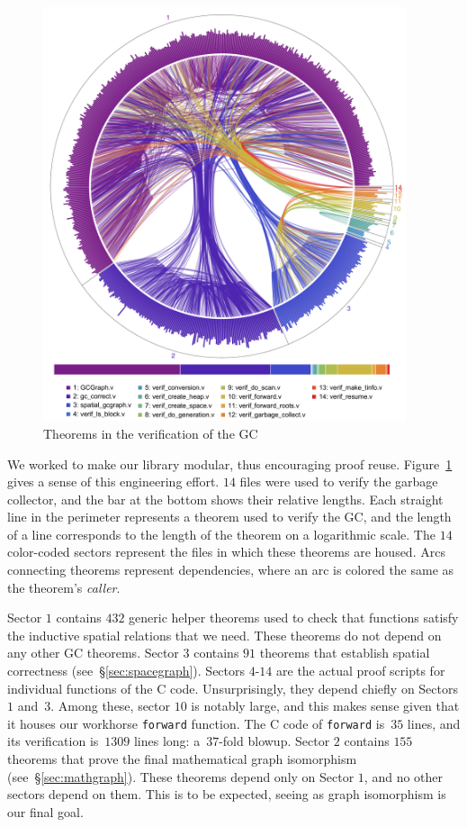 \documentclass[acmsmall,screen]{acmart}
\newcommand{\li}[1]{{\texttt{\small #1}}}
\begin{document}
\begin{figure}
\includegraphics[width=0.95\textwidth]{certigc_theorems}
\caption{Theorems in the verification of the GC}
\label{fig:connectedness}
\end{figure}

We worked to make our library modular, thus encouraging 
proof reuse. Figure~\ref{fig:connectedness} gives a sense of this 
engineering effort.
$14$ files were used to verify the garbage collector, and
the bar at the bottom shows their relative lengths.
Each straight line in the perimeter represents a theorem used to verify the GC, 
and the length of a line corresponds to the length of the theorem on a 
logarithmic scale. The $14$ color-coded sectors represent the files in which 
these theorems are housed. Arcs connecting theorems represent dependencies, 
where an arc is colored the same as the theorem's \emph{caller}.

Sector $1$ contains $432$ generic helper theorems used to check that functions
satisfy the inductive spatial relations that we need. These theorems do not depend
on any other GC theorems. Sector $3$ contains $91$ theorems that establish  
spatial correctness (see~\S\ref{sec:spacegraph}). Sectors $4$-$14$ are the actual
proof scripts for individual functions of the C code. Unsurprisingly, they depend
chiefly on Sectors $1$ and~$3$. 
Among these, sector $10$ is notably large, and this makes sense given that it houses 
our workhorse \li{forward} function. The C code of \li{forward} is~$35$ lines, 
and its verification is~$1309$ lines long: a~$37$-fold blowup.
Sector $2$ contains $155$ theorems that 
prove the final mathematical graph isomorphism (see~\S\ref{sec:mathgraph}).
These theorems depend only on Sector $1$, 
and no other sectors depend on them. This is to be expected, seeing as graph
isomorphism is our final goal. 
\end{document}
